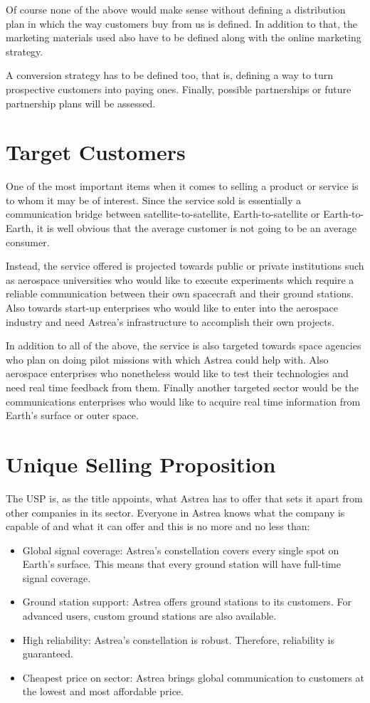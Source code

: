 Of course none of the above would make sense without defining a distribution plan in which the way customers buy from us is defined. In addition to that, the marketing materials used also have to be defined along with the online marketing strategy.

A conversion strategy has to be defined too, that is, defining a way to turn prospective customers into paying ones. Finally, possible partnerships or future partnership plans will be assessed.

\section{Target Customers}
One of the most important items when it comes to selling a product or service is to whom it may be of interest. Since the service sold is essentially a communication bridge between satellite-to-satellite, Earth-to-satellite or Earth-to-Earth, it is well obvious that the average customer is not going to be an average consumer.

Instead, the service offered is projected towards public or private institutions such as aerospace universities who would like to execute experiments which require a reliable communication between their own spacecraft and their ground stations. Also towards start-up enterprises who would like to enter into the aerospace industry and need Astrea's infrastructure to accomplish their own projects.

In addition to all of the above, the service is also targeted towards space agencies who plan on doing pilot missions with which Astrea could help with. Also aerospace enterprises who nonetheless would like to test their technologies and need real time feedback from them. Finally another targeted sector would be the communications enterprises who would like to acquire real time information from Earth's surface or outer space.

\section{Unique Selling Proposition}
The USP is, as the title appoints, what Astrea has to offer that sets it apart from other companies in its sector. Everyone in Astrea knows what the company is capable of and what it can offer and this is no more and no less than:

\begin{itemize}
\item Global signal coverage: Astrea's constellation covers every single spot on Earth's surface. This means that every ground station will have full-time signal coverage.
\item Ground station support: Astrea offers ground stations to its customers. For advanced users, custom ground stations are also available.
\item High reliability: Astrea's constellation is robust. Therefore, reliability is guaranteed.
\item Cheapest price on sector: Astrea brings global communication to customers at the lowest and most affordable price.
\end{itemize}

